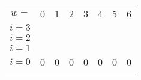 \documentclass[mathserif]{beamer}
\begin{document}
{\begin{figure}[!ht]
  \centering
  \begin{minipage}[c]{0.45\linewidth}
  \end{minipage}
  \begin{minipage}[c]{0.45\linewidth}
      \begin{tabular}{c|c|c|c|c|c|c|c|}
        \multicolumn{1}{r}{$w=$}& \multicolumn{1}{c}{0} & \multicolumn{1}{c}{1} & \multicolumn{1}{c}{2} & \multicolumn{1}{c}{3} & \multicolumn{1}{c}{4} & \multicolumn{1}{c}{5} & \multicolumn{1}{c}{6}\\
        \hhline{~-------}
        $i=3$ &  &  &  &  &  &  &  \\
        \hhline{~-------}
        $i=2$ &  &  &  &  &  &  &     \\
        \hhline{~-------}
        $i=1$ &  &  &  &  &  &  &     \\
        \hhline{~-------}
        $i=0$ & 0 & 0 & 0 & 0 & 0 & 0 & 0 \\
        \hhline{~-------}
      \end{tabular}
  \end{minipage}
\end{figure}
}
\end{document}
